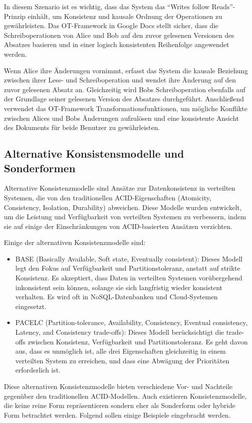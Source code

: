 In diesem Szenario ist es wichtig, dass das System das \enquote{Writes follow Reads}-Prinzip einhält, um Konsistenz und kausale Ordnung der Operationen zu gewährleisten. Das OT-Framework in Google Docs stellt sicher, dass die Schreiboperationen von Alice und Bob auf den zuvor gelesenen Versionen des Absatzes basieren und in einer logisch konsistenten Reihenfolge angewendet werden.

Wenn Alice ihre Änderungen vornimmt, erfasst das System die kausale Beziehung zwischen ihrer Lese- und Schreiboperation und wendet ihre Änderung auf den zuvor gelesenen Absatz an. Gleichzeitig wird Bobs Schreiboperation ebenfalls auf der Grundlage seiner gelesenen Version des Absatzes durchgeführt. Anschließend verwendet das OT-Framework Transformationsfunktionen, um mögliche Konflikte zwischen Alices und Bobs Änderungen aufzulösen und eine konsistente Ansicht des Dokuments für beide Benutzer zu gewährleisten.

\subsection{Alternative Konsistensmodelle und Sonderformen}
Alternative Konsistenzmodelle sind Ansätze zur Datenkonsistenz in verteilten Systemen, die von den traditionellen ACID-Eigenschaften (Atomicity, Consistency, Isolation, Durability) abweichen. Diese Modelle wurden entwickelt, um die Leistung und Verfügbarkeit von verteilten Systemen zu verbessern, indem sie auf einige der Einschränkungen von ACID-basierten Ansätzen verzichten.

Einige der alternativen Konsistenzmodelle sind:
\begin{itemize}
\item BASE (Basically Available, Soft state, Eventually consistent): Dieses Modell legt den Fokus auf Verfügbarkeit und Partitionstoleranz, anstatt auf strikte Konsistenz. Es akzeptiert, dass Daten in verteilten Systemen vorübergehend inkonsistent sein können, solange sie sich langfristig wieder konsistent verhalten. Es wird oft in NoSQL-Datenbanken und Cloud-Systemen eingesetzt.
\item PACELC (Partition-tolerance, Availability, Consistency, Eventual consistency, Latency, and Consistency trade-offs): Dieses Modell berücksichtigt die trade-offs zwischen Konsistenz, Verfügbarkeit und Partitionstoleranz. Es geht davon aus, dass es unmöglich ist, alle drei Eigenschaften gleichzeitig in einem verteilten System zu erreichen, und dass eine Abwägung der Prioritäten erforderlich ist.
\end{itemize}
Diese alternativen Konsistenzmodelle bieten verschiedene Vor- und Nachteile gegenüber den traditionellen ACID-Modellen. Auch existieren Konsistenzmodelle, die keine reine Form repräsentieren sondern eher als Sonderform oder hybride Form betrachtet werden. Folgend sollen einige Beispiele eingebracht werden. 

